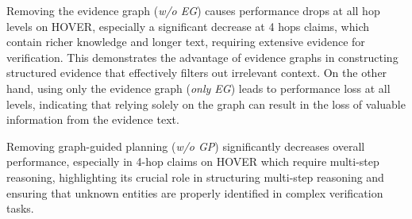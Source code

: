  Removing the evidence graph (\textit{w/o EG}) causes performance drops at all hop levels on HOVER, especially a significant decrease at 4 hops claims, which contain richer knowledge and longer text, requiring extensive evidence for verification. This demonstrates the advantage of evidence graphs in constructing structured evidence that effectively filters out irrelevant context. On the other hand, using only the evidence graph (\textit{only EG}) leads to performance loss at all levels, indicating that relying solely on the graph can result in the loss of valuable information from the evidence text.

 Removing graph-guided planning (\textit{w/o GP}) significantly decreases overall performance, especially in 4-hop claims on HOVER which require multi-step reasoning, highlighting its crucial role in structuring multi-step reasoning and ensuring that unknown entities are properly identified in complex verification tasks.


